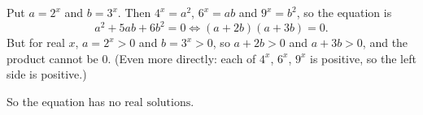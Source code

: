 Put $a=2^x$ and $b=3^x$. Then $4^x=a^2$, $6^x=ab$ and $9^x=b^2$, so the equation is
\[a^2+5ab+6b^2=0\iff(a+2b)(a+3b)=0.\]
But for real $x$, $a=2^x>0$ and $b=3^x>0$, so $a+2b>0$ and $a+3b>0$, and the product cannot be $0$. (Even more directly: each of $4^x$, $6^x$, $9^x$ is positive, so the left side is positive.)

So the equation has $\boxed{\text{no real solutions}}$.
